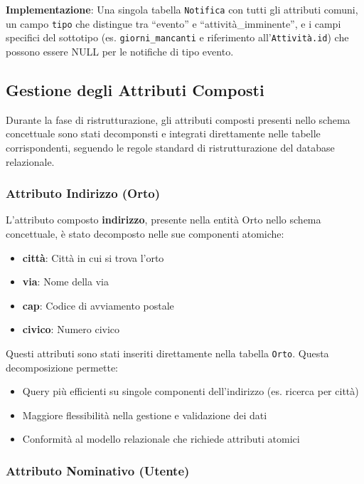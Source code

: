 \documentclass[12pt,a4paper]{article}
\begin{document}
\textbf{Implementazione}: Una singola tabella \texttt{Notifica} con tutti gli attributi comuni, un campo \texttt{tipo} che distingue tra ``evento'' e ``attività\_imminente'', e i campi specifici del sottotipo (es. \texttt{giorni\_mancanti} e riferimento all'\texttt{Attività.id}) che possono essere NULL per le notifiche di tipo evento.

\subsection{Gestione degli Attributi Composti}

Durante la fase di ristrutturazione, gli attributi composti presenti nello schema concettuale sono stati decomponsti e integrati direttamente nelle tabelle corrispondenti, seguendo le regole standard di ristrutturazione del database relazionale.

\subsubsection{Attributo Indirizzo (Orto)}

L'attributo composto \textbf{indirizzo}, presente nella entità Orto nello schema concettuale, è stato decomposto nelle sue componenti atomiche:

\begin{itemize}
    \item \textbf{città}: Città in cui si trova l'orto
    \item \textbf{via}: Nome della via
    \item \textbf{cap}: Codice di avviamento postale
    \item \textbf{civico}: Numero civico
\end{itemize}

Questi attributi sono stati inseriti direttamente nella tabella \texttt{Orto}. Questa decomposizione permette:

\begin{itemize}
    \item Query più efficienti su singole componenti dell'indirizzo (es. ricerca per città)
    \item Maggiore flessibilità nella gestione e validazione dei dati
    \item Conformità al modello relazionale che richiede attributi atomici
\end{itemize}

\subsubsection{Attributo Nominativo (Utente)}
\end{document}
